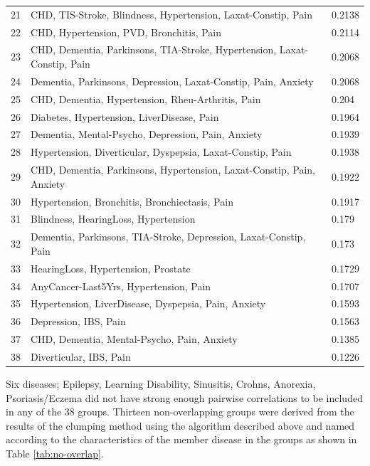 \documentclass[12pt,]{report}
\begin{document}
\begin{table}[]
{\begin{tabular}{@{}lll@{}}
    21 & CHD, TIS-Stroke, Blindness, Hypertension, Laxat-Constip, Pain & 0.2138 \\
    22 & CHD, Hypertension, PVD, Bronchitis, Pain & 0.2114 \\
    23 & CHD, Dementia, Parkinsons, TIA-Stroke, Hypertension, Laxat-Constip, Pain     & 0.2068 \\
    24 & Dementia, Parkinsons, Depression, Laxat-Constip, Pain, Anxiety & 0.2068      \\
    25 & CHD, Dementia, Hypertension, Rheu-Arthritis, Pain & 0.204 \\
    26 & Diabetes, Hypertension, LiverDisease, Pain & 0.1964 \\
    27 & Dementia, Mental-Psycho, Depression, Pain, Anxiety & 0.1939 \\
    28 & Hypertension, Diverticular, Dyspepsia, Laxat-Constip, Pain & 0.1938 \\
    29 & CHD, Dementia, Parkinsons, Hypertension, Laxat-Constip, Pain, Anxiety &      0.1922 \\
    30 & Hypertension, Bronchitis, Bronchiectasis, Pain & 0.1917 \\
    31 & Blindness, HearingLoss, Hypertension & 0.179 \\
    32 & Dementia, Parkinsons, TIA-Stroke, Depression, Laxat-Constip, Pain & 0.173     \\
    33 & HearingLoss, Hypertension, Prostate & 0.1729 \\
    34 & AnyCancer-Last5Yrs, Hypertension, Pain & 0.1707 \\
    35 & Hypertension, LiverDisease, Dyspepsia, Pain, Anxiety & 0.1593 \\
    36 & Depression, IBS, Pain & 0.1563 \\
    37 & CHD, Dementia, Mental-Psycho, Pain, Anxiety & 0.1385 \\
    38 & Diverticular, IBS, Pain & 0.1226 \\ \bottomrule
    \end{tabular}%
  }
\end{table}

Six diseases; Epilepsy, Learning Disability, Sinusitis, Crohns,
Anorexia, Psoriasis/Eczema did not have strong enough pairwise
correlations to be included in any of the 38 groups. Thirteen
non-overlapping groups were derived from the results of the clumping
method using the algorithm described above and named according to the
characteristics of the member disease in the groups as shown in Table
\ref{tab:no-overlap}.
\end{document}
